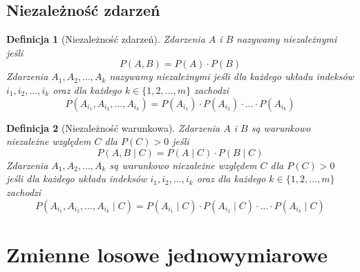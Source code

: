 \documentclass[11pt, leqno]{scrartcl}
\theoremstyle{mydefinition}
\newtheorem{definition}{Definicja}[subsection]
\theoremstyle{mytheorem}
\begin{document}
    \subsection{Niezależność zdarzeń}
    \begin{definition}[Niezależność zdarzeń]
        Zdarzenia $A$ i $B$ nazywamy niezależnymi jeśli
        \[
            P(A,B)=P(A) \cdot P(B)
        \]
        Zdarzenia $A_1,A_2,\ldots,A_k$ nazywamy niezależnymi jeśli dla
        każdego układu indeksów $i_1,i_2,\ldots,i_k$ oraz dla każdego
        $k \in \{1,2,\ldots,m\}$ zachodzi
        \[
            P(A_{i_1},A_{i_2},\ldots,A_{i_k})=P(A_{i_1}) \cdot
            P(A_{i_2}) \cdot \ldots \cdot P(A_{i_k})
        \]
    \end{definition}
    \begin{definition}[Niezależność warunkowa]
        Zdarzenia $A$ i $B$ są warunkowo niezależne względem $C$
        dla $P(C)>0$ jeśli
        \[
            P(A,B \mid C)=P(A \mid C) \cdot P(B \mid C)
        \]
        Zdarzenia $A_1,A_2,\ldots,A_k$ są warunkowo niezależne względem $C$ dla
        $P(C)>0$ jeśli dla każdego układu indeksów $i_1,i_2,\ldots,i_k$ oraz dla
        każdego $k \in \{1,2,\ldots,m\}$ zachodzi
        \[
            P(A_{i_1},A_{i_2},\ldots,A_{i_k} \mid C)=P(A_{i_1} \mid C) \cdot
            P(A_{i_2} \mid C) \cdot \ldots \cdot P(A_{i_k} \mid C)
        \]
    \end{definition}

    \section{Zmienne losowe jednowymiarowe}
\end{document}
